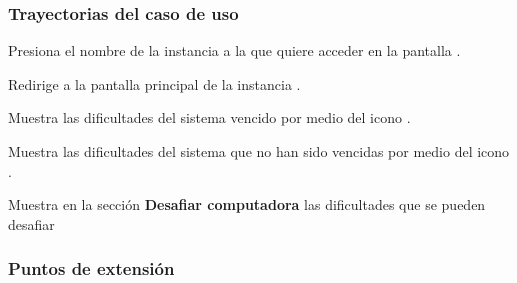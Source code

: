 \begin{UseCase}








\end{UseCase}

\subsubsection{Trayectorias del caso de uso}

\begin{UCtrayectoria}%
%

    \Actor Presiona el nombre de la instancia a la que quiere acceder en la pantalla .

    \Sistema Redirige a la pantalla principal de la instancia .

    \Sistema Muestra las dificultades del sistema vencido por medio del icono \IUCpuvencida.

    \Sistema Muestra las dificultades del sistema que no han sido vencidas por medio del icono \IUCpunovencida.

    \Sistema Muestra en la sección {\bf Desafiar computadora} las dificultades que se pueden desafiar 

\end{UCtrayectoria}

\subsubsection{Puntos de extensión}

